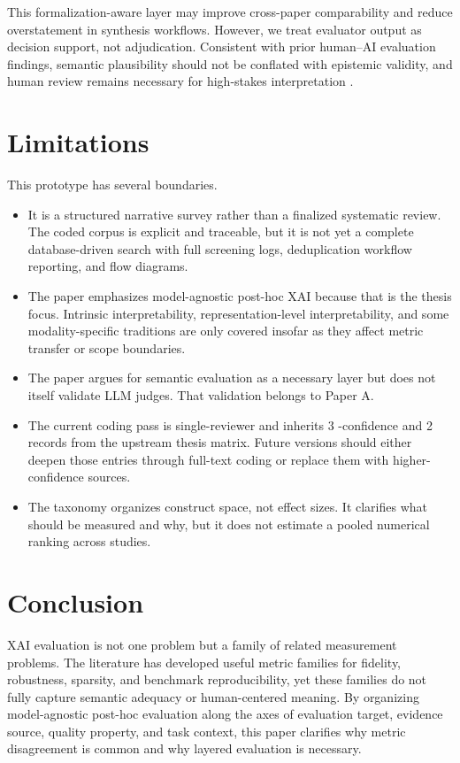\documentclass[twoside,11pt]{article}
\begin{document}
This formalization-aware layer may improve cross-paper comparability and reduce
overstatement in synthesis workflows. However, we treat evaluator output as decision
support, not adjudication. Consistent with prior human--{AI} evaluation findings,
semantic plausibility should not be conflated with epistemic validity, and human
review remains necessary for high-stakes interpretation
\citep{bucinca2020proxy,bansal2021whole,fok2023verifiability}.

\section{Limitations}

This prototype has several boundaries.
\begin{itemize}[leftmargin=*]
\item It is a structured narrative survey rather than a finalized
systematic review. The coded corpus is explicit and traceable, but it is
not yet a complete database-driven search with full screening logs,
deduplication workflow reporting, and flow diagrams.
\item The paper emphasizes model-agnostic post-hoc XAI because that is
the thesis focus. Intrinsic interpretability, representation-level
interpretability, and some modality-specific traditions are only covered
insofar as they affect metric transfer or scope boundaries.
\item The paper argues for semantic evaluation as a necessary layer but
does not itself validate LLM judges. That validation belongs to Paper A.
\item The current coding pass is single-reviewer and inherits 3
-confidence and 2  records from the
upstream thesis matrix. Future versions should either deepen those
entries through full-text coding or replace them with higher-confidence
sources.
\item The taxonomy organizes construct space, not effect sizes. It
clarifies what should be measured and why, but it does not estimate a
pooled numerical ranking across studies.
\end{itemize}

\section{Conclusion}

XAI evaluation is not one problem but a family of related measurement
problems. The literature has developed useful metric families for
fidelity, robustness, sparsity, and benchmark reproducibility, yet
these families do not fully capture semantic adequacy or human-centered
meaning. By organizing model-agnostic post-hoc evaluation along the axes
of evaluation target, evidence source, quality property, and task
context, this paper clarifies why metric disagreement is common and why
layered evaluation is necessary.
\end{document}
